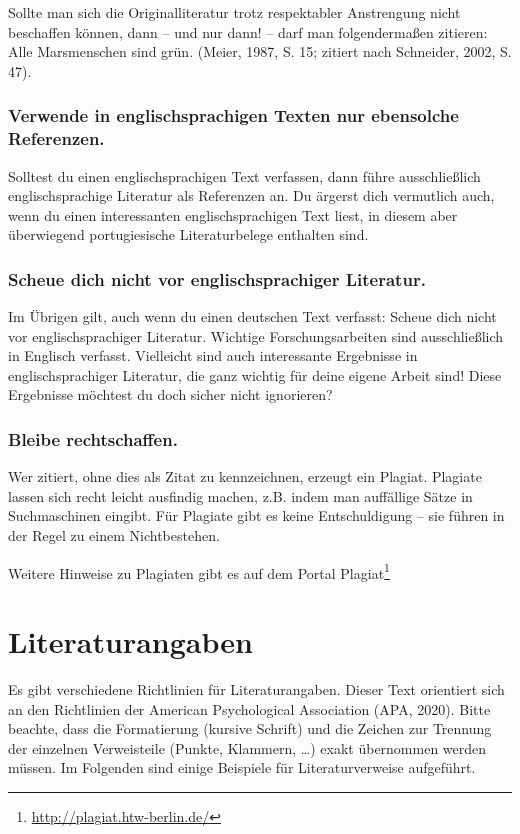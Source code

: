 \documentclass{../cssheet}
\begin{document}
Sollte man sich die Originalliteratur trotz respektabler Anstrengung
nicht beschaffen können, dann -- und nur dann! -- darf man
folgendermaßen zitieren: \glqq{}Alle Marsmenschen sind grün.\grqq{} (Meier, 1987, S.
15; zitiert nach Schneider, 2002, S. 47).

\subsubsection*{Verwende in englischsprachigen Texten nur ebensolche Referenzen.}

Solltest du einen englischsprachigen Text verfassen, dann führe
ausschließlich englischsprachige Literatur als Referenzen an. Du ärgerst
dich vermutlich auch, wenn du einen interessanten englischsprachigen
Text liest, in diesem aber überwiegend portugiesische Literaturbelege
enthalten sind.

\subsubsection*{Scheue dich nicht vor englischsprachiger Literatur.}

Im Übrigen gilt, auch wenn du einen deutschen Text verfasst: Scheue dich
nicht vor englischsprachiger Literatur. Wichtige Forschungsarbeiten sind
ausschließlich in Englisch verfasst. Vielleicht sind auch interessante
Ergebnisse in englischsprachiger Literatur, die ganz wichtig für deine
eigene Arbeit sind! Diese Ergebnisse möchtest du doch sicher nicht
ignorieren?

\subsubsection*{Bleibe rechtschaffen.}

Wer zitiert, ohne dies als Zitat zu kennzeichnen, erzeugt ein Plagiat.
Plagiate lassen sich recht leicht ausfindig machen, z.B. indem man
auffällige Sätze in Suchmaschinen eingibt. Für Plagiate gibt es keine
Entschuldigung -- sie führen in der Regel zu einem Nichtbestehen.

Weitere Hinweise zu Plagiaten gibt es auf dem Portal Plagiat\footnote{\url{http://plagiat.htw-berlin.de/}}

\section{Literaturangaben}

Es gibt verschiedene Richtlinien für Literaturangaben. Dieser Text
orientiert sich an den Richtlinien der American Psychological
Association (APA, 2020). Bitte beachte, dass die Formatierung (kursive
Schrift) und die Zeichen zur Trennung der einzelnen Verweisteile
(Punkte, Klammern, \ldots) exakt übernommen werden müssen. Im Folgenden
sind einige Beispiele für Literaturverweise aufgeführt.
\end{document}
